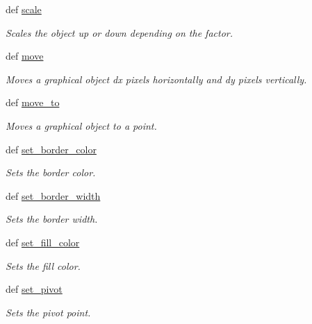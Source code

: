 \begin{DoxyCompactItemize}
def \hyperlink{classbroken__cs110graphics_1_1Fillable_a054b40e148c8052e7fe2b1f45749802b}{scale}
\begin{DoxyCompactList}\small\item\em Scales the object up or down depending on the factor. \item\end{DoxyCompactList}\item 
def \hyperlink{classbroken__cs110graphics_1_1Fillable_ae0a64b349be4d163ccf5759cf3d7f0bb}{move}
\begin{DoxyCompactList}\small\item\em Moves a graphical object dx pixels horizontally and dy pixels vertically. \item\end{DoxyCompactList}\item 
def \hyperlink{classbroken__cs110graphics_1_1Fillable_ae7f8de11eb7e2fa1cebea3e978e1c3f0}{move\_\-to}
\begin{DoxyCompactList}\small\item\em Moves a graphical object to a point. \item\end{DoxyCompactList}\item 
def \hyperlink{classbroken__cs110graphics_1_1Fillable_a0c0ae1c5c92000354837bc3060de6962}{set\_\-border\_\-color}
\begin{DoxyCompactList}\small\item\em Sets the border color. \item\end{DoxyCompactList}\item 
def \hyperlink{classbroken__cs110graphics_1_1Fillable_aa64f7079bd985ed884bf1d066dfc47af}{set\_\-border\_\-width}
\begin{DoxyCompactList}\small\item\em Sets the border width. \item\end{DoxyCompactList}\item 
def \hyperlink{classbroken__cs110graphics_1_1Fillable_a4187eab5130ba740b796270680114d94}{set\_\-fill\_\-color}
\begin{DoxyCompactList}\small\item\em Sets the fill color. \item\end{DoxyCompactList}\item 
def \hyperlink{classbroken__cs110graphics_1_1Fillable_a3da844c8f1db21d0f0b95d6a66a3e18b}{set\_\-pivot}
\begin{DoxyCompactList}\small\item\em Sets the pivot point. \item\end{DoxyCompactList}\end{DoxyCompactItemize}


